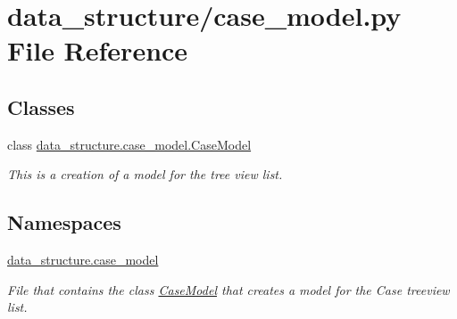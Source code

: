 \hypertarget{a00014}{}\section{data\+\_\+structure/case\+\_\+model.py File Reference}
\label{a00014}
\subsection*{Classes}
\begin{DoxyCompactItemize}
\item 
class \hyperlink{a00082}{data\+\_\+structure.\+case\+\_\+model.\+Case\+Model}
\begin{DoxyCompactList}\small\item\em This is a creation of a model for the tree view list. \end{DoxyCompactList}\end{DoxyCompactItemize}
\subsection*{Namespaces}
\begin{DoxyCompactItemize}
\item 
 \hyperlink{a00052}{data\+\_\+structure.\+case\+\_\+model}
\begin{DoxyCompactList}\small\item\em File that contains the class \hyperlink{a00082}{Case\+Model} that creates a model for the Case treeview list. \end{DoxyCompactList}\end{DoxyCompactItemize}
